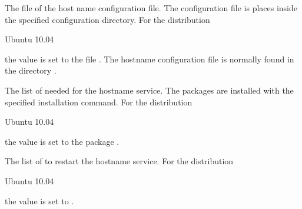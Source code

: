 
The file  of the host name configuration file. The configuration file
is places inside the specified configuration directory.
For the distribution
\begin{inparaitem}
\item[\TheDistribution{ubuntu}] Ubuntu 10.04
\end{inparaitem}
the value is set to the file . The hostname configuration
file is normally found in the directory .


The list of  needed for the hostname service. The packages
are installed with the specified installation command.
For the distribution
\begin{inparaitem}
\item[\TheDistribution{ubuntu}] Ubuntu 10.04
\end{inparaitem}
the value is set to the package .


The list of  to restart the hostname service.
For the distribution
\begin{inparaitem}
\item[\TheDistribution{ubuntu}] Ubuntu 10.04
\end{inparaitem}
the value is set to .

